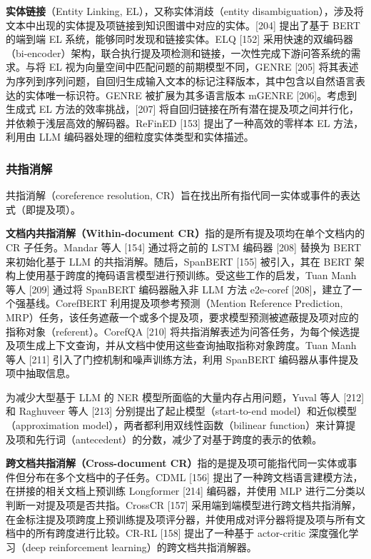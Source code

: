 \documentclass[11pt,UTF8,fontset=fandol]{ctexart}
\begin{document}
\textbf{实体链接}（Entity Linking, EL），又称实体消歧（entity disambiguation），涉及将文本中出现的实体提及项链接到知识图谱中对应的实体。[204] 提出了基于 BERT 的端到端 EL 系统，能够同时发现和链接实体。ELQ [152] 采用快速的双编码器（bi-encoder）架构，联合执行提及项检测和链接，一次性完成下游问答系统的需求。与将 EL 视为向量空间中匹配问题的前期模型不同，GENRE [205] 将其表述为序列到序列问题，自回归生成输入文本的标记注释版本，其中包含以自然语言表达的实体唯一标识符。GENRE 被扩展为其多语言版本 mGENRE [206]。考虑到生成式 EL 方法的效率挑战，[207] 将自回归链接在所有潜在提及项之间并行化，并依赖于浅层高效的解码器。ReFinED [153] 提出了一种高效的零样本 EL 方法，利用由 LLM 编码器处理的细粒度实体类型和实体描述。

\subsubsection{共指消解}

共指消解（coreference resolution, CR）旨在找出所有指代同一实体或事件的表达式（即提及项）。

\textbf{文档内共指消解（Within-document CR）}指的是所有提及项均在单个文档内的 CR 子任务。Mandar 等人 [154] 通过将之前的 LSTM 编码器 [208] 替换为 BERT 来初始化基于 LLM 的共指消解。随后，SpanBERT [155] 被引入，其在 BERT 架构上使用基于跨度的掩码语言模型进行预训练。受这些工作的启发，Tuan Manh 等人 [209] 通过将 SpanBERT 编码器融入非 LLM 方法 e2e-coref [208]，建立了一个强基线。CorefBERT 利用提及项参考预测（Mention Reference Prediction, MRP）任务，该任务遮蔽一个或多个提及项，要求模型预测被遮蔽提及项对应的指称对象（referent）。CorefQA [210] 将共指消解表述为问答任务，为每个候选提及项生成上下文查询，并从文档中使用这些查询抽取指称对象跨度。Tuan Manh 等人 [211] 引入了门控机制和噪声训练方法，利用 SpanBERT 编码器从事件提及项中抽取信息。

为减少大型基于 LLM 的 NER 模型所面临的大量内存占用问题，Yuval 等人 [212] 和 Raghuveer 等人 [213] 分别提出了起止模型（start-to-end model）和近似模型（approximation model），两者都利用双线性函数（bilinear function）来计算提及项和先行词（antecedent）的分数，减少了对基于跨度的表示的依赖。

\textbf{跨文档共指消解（Cross-document CR）}指的是提及项可能指代同一实体或事件但分布在多个文档中的子任务。CDML [156] 提出了一种跨文档语言建模方法，在拼接的相关文档上预训练 Longformer [214] 编码器，并使用 MLP 进行二分类以判断一对提及项是否共指。CrossCR [157] 采用端到端模型进行跨文档共指消解，在金标注提及项跨度上预训练提及项评分器，并使用成对评分器将提及项与所有文档中的所有跨度进行比较。CR-RL [158] 提出了一种基于 actor-critic 深度强化学习（deep reinforcement learning）的跨文档共指消解器。
\end{document}

